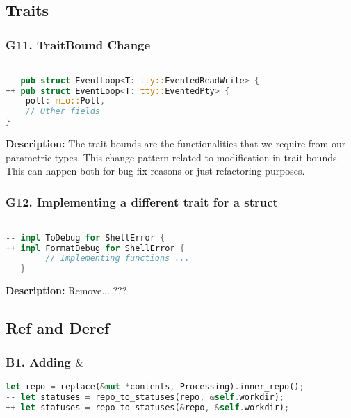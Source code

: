 \subsection{Traits}
\subsubsection{G11. TraitBound Change}

\begin{lstlisting}[language=Rust, style=colouredRust, label={l3}]

-- pub struct EventLoop<T: tty::EventedReadWrite> {
++ pub struct EventLoop<T: tty::EventedPty> {
    poll: mio::Poll,
    // Other fields
}

\end{lstlisting}

\noindent \textbf{Description:} The trait bounds are the functionalities that we require from our parametric types. This change pattern related to modification in trait bounds. This can happen both for bug fix reasons or just refactoring purposes.

\subsubsection{G12. Implementing a different trait for a struct}

\begin{lstlisting}[language=Rust, style=colouredRust, label={l3}]

-- impl ToDebug for ShellError {
++ impl FormatDebug for ShellError {
        // Implementing functions ...
   }

\end{lstlisting}

\noindent \textbf{Description:} Remove... ???

\subsection{Ref and Deref}
\subsubsection{B1. Adding $\&$}

\begin{lstlisting}[language=Rust, style=colouredRust, label={l3}]
let repo = replace(&mut *contents, Processing).inner_repo();
-- let statuses = repo_to_statuses(repo, &self.workdir);
++ let statuses = repo_to_statuses(&repo, &self.workdir);
\end{lstlisting}

